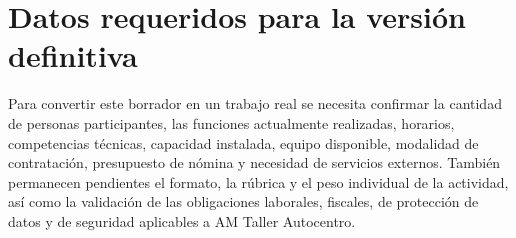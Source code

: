 \documentclass[12pt,letterpaper,oneside]{article}
\begin{document}
\section{Datos requeridos para la versión definitiva}

Para convertir este borrador en un trabajo real se necesita confirmar la cantidad de personas participantes, las funciones actualmente realizadas, horarios, competencias técnicas, capacidad instalada, equipo disponible, modalidad de contratación, presupuesto de nómina y necesidad de servicios externos. También permanecen pendientes el formato, la rúbrica y el peso individual de la actividad, así como la validación de las obligaciones laborales, fiscales, de protección de datos y de seguridad aplicables a AM Taller Autocentro.
\clearpage
\printbibliography[title={Fuentes de consulta}]
\end{document}
